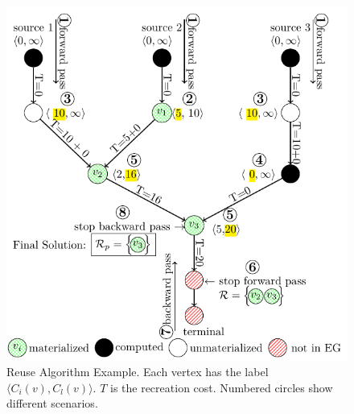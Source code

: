 \begin{figure}[t]
\centering
\includegraphics[width=\linewidth]{../images/tikz-standalone/reuse-algorithm}
\caption{Reuse Algorithm Example. Each vertex has the label $\langle C_i(v),C_l(v) \rangle$. $T$ is the recreation cost. Numbered circles show different scenarios.}
\label{fig-reuse-algorithm}
\end{figure}

